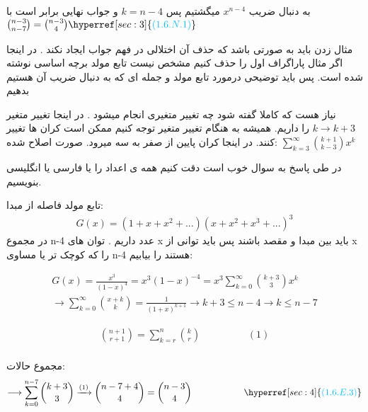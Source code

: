 \documentclass[11pt,largemargins]{h2wp}
\begin{document}
      به دنبال ضریب
      $ x ^ {n-4 } $
      میگشتیم پس 
      $ k = n-4 $
      و جواب نهایی برابر است با
      $\binom{n-3}{n-7} = \binom{n-3}{4} \\ \\ \hyperref[sec:3]{\textcolor{capri}{(1.6.N.1)}} \\   $
  
  
      
\notes

\Enote
  مثال زدن باید به صورتی باشد که حذف آن اختلالی در فهم جواب ایجاد نکند . در اینجا اگر مثال پاراگراف اول را حذف کنیم مشخص نیست تابع مولد برچه اساسی نوشته شده است. پس باید توضیحی درمورد تابع مولد و جمله ای که به دنبال ضریب آن هستیم بدهیم \label{sec:1} 
		
\Enote
     نیاز هست که کاملا گفته شود چه تغییر متغیری انجام میشود . در اینجا تغییر متغیر $ k \rightarrow {k+3} $   را داریم.  همیشه به هنگام تغییر متغیر توجه کنیم ممکن است کران ها تغییر کنند. در اینجا کران پایین از صفر به سه میرود. \label{sec:2} 
	 صورت اصلاح شده:
	 $ \sum_{k=3}^{\infty}\binom{k+1}{k-3} x^k $
	
\Nnote		
	  در طی پاسخ به سوال خوب است دقت کنیم همه ی اعداد را یا فارسی یا انگلیسی 
	  بنویسیم. \label{sec:3} 
	  
	  
\solution
  تابع مولد فاصله از مبدا:
   \begin{align*}
   G(x)=(1+x+x^2+...)(x+x^2+x^3+...)^3
   \end{align*}
   در مجموع n-4 عدد داریم . توان های x باید بین مبدا و مقصد باشند پس باید توانی از x را که کوچک تر یا مساوی n-4 هستند را بیابیم:
   
   \begin{align*}
   G(x)= \frac{x^3}{(1-x)^4} = x^3 (1-x)^{-4} = x^3 \sum_{k=0}^{\infty}\binom{k+3}{3} x^k \\ 
   \longrightarrow \sum_{k=0}^{\infty}\binom{x+k}{k} = \frac{1}{(1+x)^{k+1}} 
   \longrightarrow k+3 \le n-4 \rightarrow k \le n-7
   \end{align*}
   
   \begin{align*}
     \binom{n+1}{r+1} = \sum_{k=r}^{n} \binom{k}{r} \hspace{2cm} (1) \\
  \end{align*}
  
   مجموع حالات: 
   \begin{align*}
   \longrightarrow \sum_{k=0}^{n-7}\binom{k+3}{3} \xrightarrow{(1)}  \binom{n-7+4}{4} = \binom{n-3}{4}   \hspace{2cm} 
    { \hyperref[sec:4]{\textcolor{capri}{(1.6.E.3)}}}
   \end{align*}
   
\end{document}
